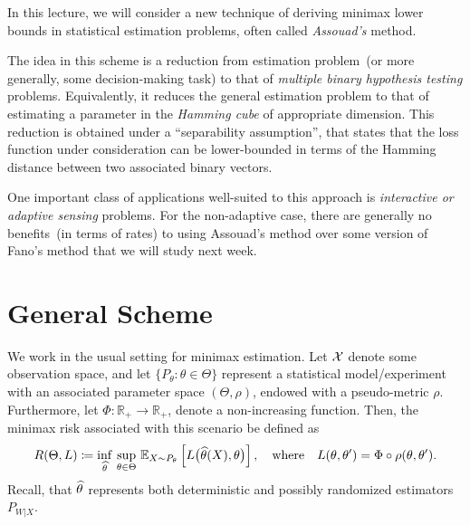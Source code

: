\documentclass[12pt]{article}
\begin{document}
	\MakeScribeTop


In this lecture, we will consider a new technique of deriving minimax lower bounds in statistical estimation problems, often called \emph{Assouad's} method. 

The idea in this scheme is a reduction from estimation problem~(or more generally, some decision-making task) to that of \emph{multiple binary hypothesis testing} problems. Equivalently, it reduces the general estimation problem to that of estimating a parameter in the \emph{Hamming cube} of appropriate dimension. 
This reduction is obtained under a ``separability assumption'', that states that the loss function under consideration can be lower-bounded in terms of the Hamming distance between two associated binary vectors. 

One important class of applications well-suited to this approach is \emph{interactive or adaptive sensing} problems. For the non-adaptive case, there are generally no benefits~(in terms of rates) to using Assouad's method over some version of Fano's method that we will study next week. 

\section{General Scheme} 
\label{sec:assouad-general}
We work in the usual setting for minimax estimation. Let ${\cal X}$ denote some observation space, and let $\{P_\theta: \theta \in \Theta\}$ represent a statistical model/experiment with an associated parameter space $(\Theta, \rho)$, endowed with a pseudo-metric $\rho$. Furthermore, let $\Phi: \mathbb{R}_+ \to \mathbb{R}_+$, denote a non-increasing function. Then, the minimax risk associated with this scenario be defined as 
\begin{align}
	R(\Theta, L)  \coloneqq \inf_{\widehat{\theta}} \, \sup_{\theta \in \Theta}\, \mathbb{E}_{X\sim P_{\theta}}\left[ L\big( \widehat{\theta}(X), \theta \big) \right], \quad \text{where} \quad L(\theta, \theta') =  \Phi \circ \rho(\theta, \theta'). 
\end{align} 
Recall, that $\widehat{\theta}$ represents both deterministic and possibly randomized estimators $P_{W|X}$. 
\end{document}
